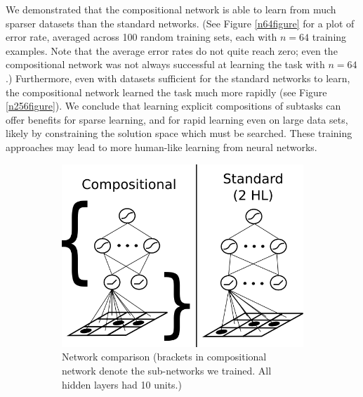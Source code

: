 \documentclass[10pt]{article}
\begin{document}
{We demonstrated that the compositional network is able to learn from much sparser datasets than the standard networks. (See Figure \ref{n64figure} for a plot of error rate, averaged across 100 random training sets, each with $n = 64$ training examples. Note that the average error rates do not quite reach zero; even the compositional network was not always successful at learning the task with $n = 64$.) Furthermore, even with datasets sufficient for the standard networks to learn, the compositional network learned the task much more rapidly (see Figure \ref{n256figure}). We conclude that learning explicit compositions of subtasks can offer benefits for sparse learning, and for rapid learning even on large data sets, likely by constraining the solution space which must be searched. These training approaches may lead to more human-like learning from neural networks.
\vspace{-10pt}
\begin{figure}[H]
    \centering
    \begin{subfigure}[c]{0.35\textwidth}
	\centering
	\includegraphics[width=\textwidth]{figures/hierarchical_NN_abstract_figure.png}
	\caption{Network comparison (brackets in compositional network denote the sub-networks we trained. All hidden layers had 10 units.)}
	\label{networkdiagram}
    \end{subfigure}
    \begin{subfigure}[c]{0.3\textwidth}
	\centering

\end{subfigure}
\end{figure}}
\end{document}
